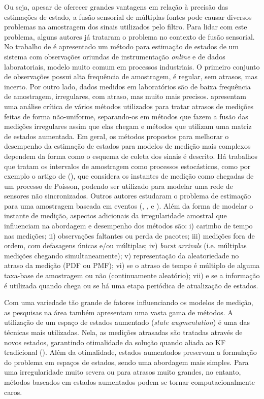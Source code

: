 Ou seja, apesar de oferecer grandes vantagens em relação à precisão das estimações de estado, a fusão sensorial de múltiplas fontes pode causar diversos problemas na amostragem dos sinais utilizados pelo filtro. Para lidar com este problema, alguns autores já trataram o problema no contexto de fusão sensorial. No trabalho de  é apresentado um método para estimação de estados de um sistema com observações oriundas de instrumentação \textit{online} e de dados laboratoriais, modelo muito comum em processos industriais. O primeiro conjunto de observações possui alta frequência de amostragem, é regular, sem atrasos, mas incerto. Por outro lado, dados medidos em laboratórios são de baixa frequência de amostragem, irregulares, com atraso, mas muito mais precisos.  apresentam uma análise crítica de vários métodos utilizados para tratar atrasos de medições feitas de forma não-uniforme, separando-os em métodos que fazem a fusão das medições irregulares assim que elas chegam e métodos que utilizam uma matriz de estados aumentada.
%
Em geral, os métodos propostos para melhorar o desempenho da estimação de estados para modelos de medição mais complexos dependem da forma como o esquema de coleta dos sinais é descrito. Há trabalhos que tratam os intervalos de amostragem como processos estocásticos, como por exemplo o artigo de (), que considera os instantes de medição como chegadas de um processo de Poisson, podendo ser utilizado para modelar uma rede de sensores não sincronizados. Outros autores estudaram o problema de estimação para uma amostragem baseada em eventos (, ,  e ). Além da forma de modelar o instante de medição, aspectos adicionais da irregularidade amostral que influenciam na abordagem e desempenho dos métodos são: i) carimbo de tempo nas medições; ii) observações faltantes ou perda de pacotes; iii) medições fora de ordem, com defasagens únicas e/ou múltiplas; iv) \textit{burst arrivals} (i.e. múltiplas medições chegando simultaneamente); v) representação da aleatoriedade no atraso da medição (PDF ou PMF); vi) se o atraso de tempo é múltiplo de alguma taxa-base de amostragem ou não (continuamente aleatório); vii) e se a informação é utilizada quando chega ou se há uma etapa periódica de atualização de estados.

Com uma variedade tão grande de fatores influenciando os modelos de medição, as pesquisas na área também apresentam uma vasta gama de métodos. A utilização de um espaço de estados aumentado (\textit{state augmentation}) é uma das técnicas mais utilizadas. Nela, as medições atrasadas são tratadas através de novos estados, garantindo otimalidade da solução quando aliada ao KF tradicional (). Além da otimalidade, estados aumentados preservam a formulação do problema em espaços de estados, sendo uma abordagem mais simples. Para uma irregularidade muito severa ou para atrasos muito grandes, no entanto, métodos baseados em estados aumentados podem se tornar computacionalmente caros. 

